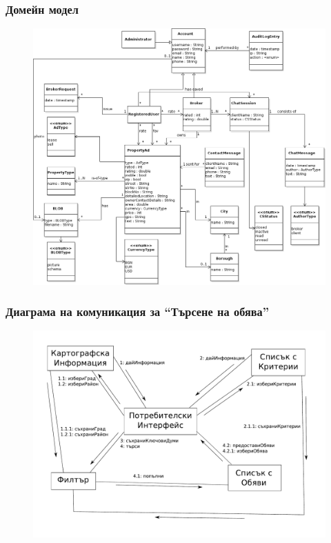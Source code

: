 \documentclass[12pt]{beamer}
\begin{document}
\begin{frame}[fragile]
\frametitle{Домейн модел}
        \begin{figure}[h]
        \centering
		\includegraphics[scale=0.25,keepaspectratio=true]{domain-model}
        \end{figure}
\end{frame}

\begin{frame}[fragile]
\frametitle{Диаграма на комуникация за ``Търсене на обява''}
        \begin{figure}[h]
        \centering
		\includegraphics[scale=0.3,keepaspectratio=true]{uml02b}
        \end{figure}
\end{frame}
\end{document}
